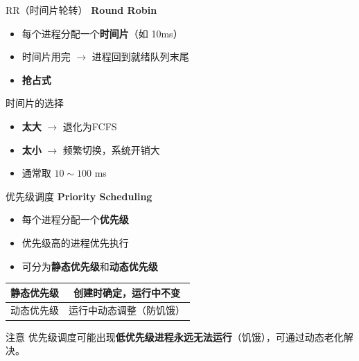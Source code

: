 \documentclass[10pt, aspectratio=169]{beamer}
\begin{document}
\begin{frame}{RR（时间片轮转）}
    \textbf{Round Robin}

    \begin{itemize}
        \item 每个进程分配一个\textbf{时间片}（如 10ms）
        \item 时间片用完 $\to$ 进程回到就绪队列末尾
        \item \textbf{抢占式}
    \end{itemize}
    \vspace{0.5em}
    \begin{block}{时间片的选择}
        \begin{itemize}
            \item \textbf{太大} $\to$ 退化为FCFS
            \item \textbf{太小} $\to$ 频繁切换，系统开销大
            \item 通常取 $10 \sim 100$ ms
        \end{itemize}
    \end{block}
\end{frame}

\begin{frame}{优先级调度}
    \textbf{Priority Scheduling}

    \begin{itemize}
        \item 每个进程分配一个\textbf{优先级}
        \item 优先级高的进程优先执行
        \item 可分为\textbf{静态优先级}和\textbf{动态优先级}
    \end{itemize}
    \vspace{0.5em}
    \begin{tabular}{|c|c|}
        \hline
        静态优先级 & 创建时确定，运行中不变 \\
        \hline
        动态优先级 & 运行中动态调整（防饥饿） \\
        \hline
    \end{tabular}
    \vspace{0.5em}
    \begin{alertblock}{注意}
        优先级调度可能出现\textbf{低优先级进程永远无法运行}（饥饿），可通过动态老化解决。
    \end{alertblock}
\end{frame}
\end{document}
